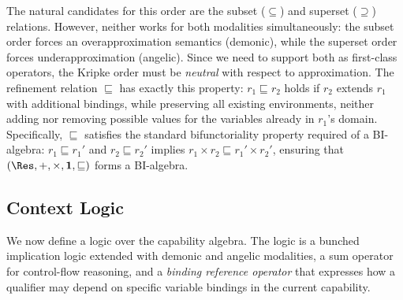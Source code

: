 The natural candidates for this order are the subset ($\subseteq$) and
superset ($\supseteq$) relations.  However, neither works for both
modalities simultaneously: the subset order forces an
overapproximation semantics (demonic), while the superset order forces
underapproximation (angelic).  Since we need to support both as
first-class operators, the Kripke order must be \emph{neutral} with
respect to approximation.  The refinement relation $\sqsubseteq$ has
exactly this property: $r_1 \sqsubseteq r_2$ holds if $r_2$ extends
$r_1$ with additional bindings, while preserving all existing
environments, neither adding nor removing possible values for the
variables already in $r_1$'s domain.  Specifically, $\sqsubseteq$
satisfies the standard bifunctoriality property required of a
BI-algebra: $r_1 \sqsubseteq r_1'$ and $r_2 \sqsubseteq r_2'$ implies
$r_1 \times r_2 \sqsubseteq r_1' \times r_2'$, ensuring that $(\Res,
+, \times, \mathbf{1}, \sqsubseteq)$ forms a BI-algebra.


\subsection{Context Logic}\label{subsec:logic}

We now define a logic over the capability algebra.  The logic is a
bunched implication logic extended with demonic and angelic
modalities, a sum operator for control-flow reasoning, and a
\emph{binding reference operator} that expresses how a qualifier may
depend on specific variable bindings in the current capability.

